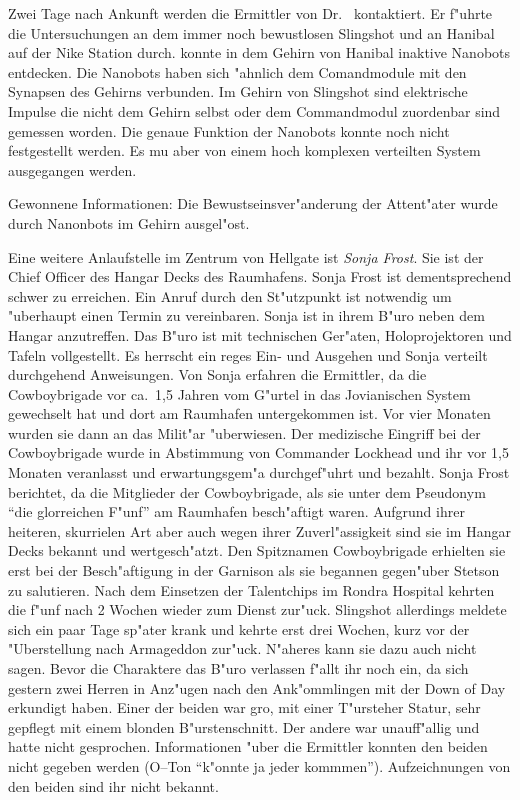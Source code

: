 
Zwei Tage nach Ankunft werden die Ermittler von Dr.~  kontaktiert. Er f"uhrte die Untersuchungen an dem immer noch bewustlosen Slingshot und an Hanibal auf der Nike Station durch.   konnte in dem Gehirn von Hanibal inaktive Nanobots entdecken. Die Nanobots haben sich "ahnlich dem Comandmodule mit den Synapsen des Gehirns verbunden. Im Gehirn von Slingshot sind elektrische Impulse die nicht dem Gehirn selbst oder dem Commandmodul zuordenbar sind gemessen worden. Die genaue Funktion der Nanobots konnte noch nicht festgestellt werden. Es mu\3 aber von einem hoch komplexen verteilten System ausgegangen werden.

\begin{remarks}
	Gewonnene Informationen: Die Bewustseinsver"anderung der Attent"ater wurde durch Nanonbots im Gehirn ausgel"ost.
\end{remarks}



Eine weitere Anlaufstelle im Zentrum von Hellgate ist \emph{Sonja Frost}. Sie ist der Chief Officer des Hangar Decks des Raumhafens. Sonja Frost ist dementsprechend schwer zu erreichen. Ein Anruf durch den St"utzpunkt ist notwendig um "uberhaupt einen Termin zu vereinbaren. Sonja ist in ihrem B"uro neben dem Hangar anzutreffen. Das B"uro ist mit technischen Ger"aten, Holoprojektoren und Tafeln vollgestellt. Es herrscht ein reges Ein- und Ausgehen und Sonja verteilt durchgehend Anweisungen. Von Sonja erfahren die Ermittler, da\3 die Cowboybrigade vor ca.~1,5 Jahren vom G"urtel in das Jovianischen System gewechselt hat und dort am Raumhafen untergekommen ist. Vor vier Monaten wurden sie dann an das Milit"ar "uberwiesen. Der medizische Eingriff bei der Cowboybrigade wurde in Abstimmung von Commander Lockhead und ihr vor 1,5 Monaten veranlasst und erwartungsgem"a\3 durchgef"uhrt und bezahlt. Sonja Frost berichtet, da\3 die Mitglieder der Cowboybrigade, als sie unter dem Pseudonym "`die glorreichen F"unf"' am Raumhafen besch"aftigt waren. Aufgrund ihrer heiteren, skurrielen Art aber auch wegen ihrer Zuverl"assigkeit sind sie im Hangar Decks bekannt und wertgesch"atzt.  Den Spitznamen Cowboybrigade erhielten sie erst bei der Besch"aftigung in der Garnison als sie begannen gegen"uber Stetson zu salutieren. Nach dem Einsetzen der Talentchips im Rondra Hospital kehrten die f"unf nach 2 Wochen wieder zum Dienst zur"uck. Slingshot allerdings meldete sich ein paar Tage sp"ater krank und kehrte erst drei Wochen, kurz vor der "Uberstellung nach Armageddon zur"uck. N"aheres kann sie dazu auch nicht sagen. Bevor die Charaktere das B"uro verlassen f"allt ihr noch ein, da\3 sich gestern zwei Herren in Anz"ugen nach den Ank"ommlingen mit der Down of Day erkundigt haben. Einer der beiden war gro\3, mit einer T"ursteher Statur, sehr gepflegt mit einem blonden B"urstenschnitt. Der andere war unauff"allig und hatte nicht gesprochen. Informationen "uber die Ermittler konnten den beiden nicht gegeben werden (O--Ton "`k"onnte ja jeder kommmen"'). Aufzeichnungen von den beiden sind ihr nicht bekannt.



